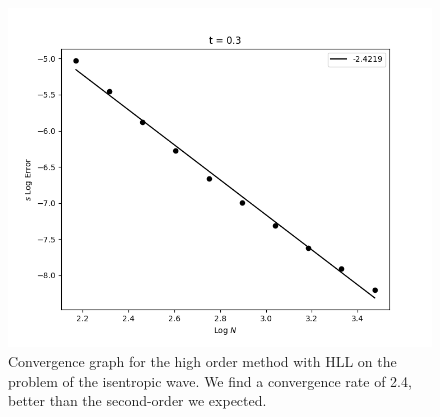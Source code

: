 \documentclass{article}
\begin{document}
\begin{figure}[h]
    \includegraphics[width=\textwidth]{highorderconv.png}
    \caption{Convergence graph for the high order method with HLL on the problem of the isentropic wave. We find a convergence rate of 2.4, better than the second-order we expected.}
    \label{fig:highorconv}
\end{figure}
\end{document}
